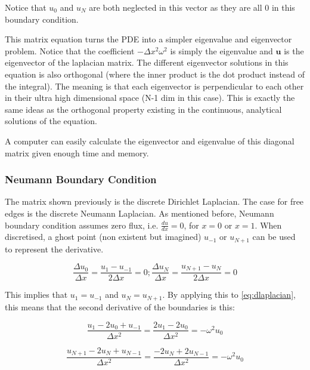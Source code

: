 Notice that $u_0$ and $u_N$ are both neglected in this vector as they are all 0 in this boundary condition.

This matrix equation turns the PDE into a simpler eigenvalue and eigenvector problem. Notice that the coefficient $-\Delta x^2\omega^2$ is simply the eigenvalue and $\mathbf{u}$ is the eigenvector of the laplacian matrix. The different eigenvector solutions in this equation is also orthogonal (where the inner product is the dot product instead of the integral). The meaning is that each eigenvector is perpendicular to each other in their ultra high dimensional space (N-1 dim in this case). This is exactly the same ideas as the orthogonal property existing in the continuous, analytical solutions of the equation.

A computer can easily calculate the eigenvector and eigenvalue of this diagonal matrix given enough time and memory.

\subsubsection{Neumann Boundary Condition}

The matrix shown previously is the discrete Dirichlet Laplacian. The case for free edges is the discrete Neumann Laplacian. As mentioned before, Neumann boundary condition assumes zero flux, i.e. $\frac{du}{dx} = 0$, for $x = 0$ or $x=1$. When discretised, a ghost point (non existent but imagined) $u_{-1}$ or $u_{N+1}$ can be used to represent the derivative.

\begin{equation}
    \frac{\Delta u_0}{\Delta x} = \frac{u_1 - u_{-1}}{2\Delta x} = 0 ;
    \frac{\Delta u_N}{\Delta x} = \frac{u_{N+1} - u_{N}}{2\Delta x} = 0
\end{equation}

This implies that $u_1 = u_{-1}$ and $u_{N} = u_{N+1}$. By applying this to \eqref{eq:dlaplacian}, this means that the second derivative of the boundaries is this:

\begin{equation}
    \frac{u_{1}-2u_{0}+u_{-1}}{\Delta x^2} = \frac{2u_1-2u_0}{\Delta x^2}= -\omega^2 u_0
\end{equation}

\begin{equation}
    \frac{u_{N+1}-2u_{N}+u_{N-1}}{\Delta x^2} = \frac{-2u_{N}+2u_{N-1}}{\Delta x^2}= -\omega^2 u_0
\end{equation}

